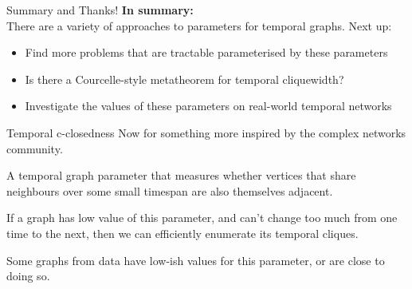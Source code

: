 \documentclass[10pt, compress]{beamer}
\newtheorem{conj}{Conjecture}
\begin{document}









\begin{frame}{Summary and Thanks!}
\textbf{In summary:\\}
There are a variety of approaches to parameters for temporal graphs.  Next up:

\begin{itemize}
\item Find more problems that are tractable parameterised by these parameters
\vspace{0.5cm}
\item Is there a Courcelle-style metatheorem for temporal cliquewidth?
\vspace{0.5cm}
\item Investigate the values of these parameters on real-world temporal networks 
\end{itemize}


\end{frame}



\begin{frame}{Temporal c-closedness}
Now for something more inspired by the complex networks community.  

\bigskip

A temporal graph parameter that measures whether vertices that share neighbours over some small timespan are also themselves adjacent.



\bigskip
If a graph has low value of this parameter, and can't change too much from one time to the next, then we can efficiently enumerate its temporal cliques.

\bigskip

Some graphs from data have low-ish values for this parameter, or are close to doing so.




\end{frame}
\end{document}

